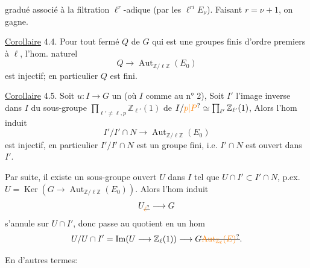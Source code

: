 gradué associé à la filtration $\ell^r$-adique (par les $\ell^{ri}E_\nu$). Faisant $r=\nu+1$, on gagne.

\uline{Corollaire} 4.4. Pour tout  fermé $Q$ de $G$ qui est une  groupes finis d'ordre premiers à $\ell$,  l'hom. naturel
\[
Q\longrightarrow\operatorname{Aut}_{\mathbb Z/\ell\mathbb Z}(E_0)
\]
est injectif; en particulier $Q$ est fini.

\uline{Corollaire} 4.5. Soit $u:I\longrightarrow G$ un    (où $I$ comme au n° 2),   Soit $I'$  l'image inverse dans $I$ du sous-groupe $\prod_{\ell'\ne\ell,p}\mathbb Z_{\ell'}(1)$ de $I/\unsure{p|P}\simeq\prod_{\ell'}\mathbb Z_{\ell'}(1)$,  Alors l'hom induit
\[
I'/I'\cap N\longrightarrow\operatorname{Aut}_{\mathbb Z/\ell\mathbb Z}(E_0)
\]
est injectif, en particulier $I'/I'\cap N$ est un groupe fini, i.e. $I'\cap N$ est ouvert dans $I'$.

Par suite, il existe un  sous-groupe ouvert $U$ dans $I$ tel que $U\cap I'\subset I'\cap N$, p.ex.  $U=\operatorname{Ker}(G\longrightarrow\operatorname{Aut}_{\mathbb Z/\ell\mathbb Z}(E_0))$. Alors l'hom induit
\[
U_{\deleted{\unsure{\ell}}}\longrightarrow G
\]
s'annule sur $U\cap I'$, donc passe au quotient en un hom
\[
U/U\cap I'=\operatorname{Im}(U\longrightarrow\mathbb Z_\ell(1))\longrightarrow G\deleted{\unsure{\operatorname{Aut}_{\mathbb Z_\ell}(E)}}.
\]

En d'autres termes:

